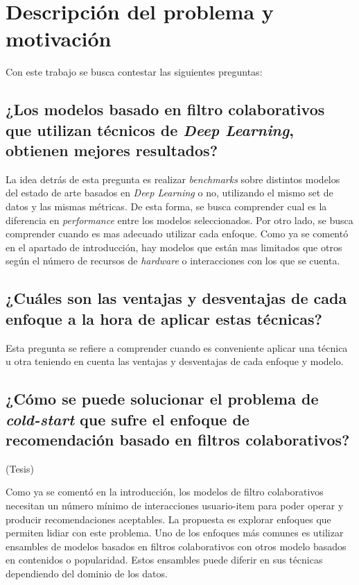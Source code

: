 \documentclass[11pt,a4paper,twoside]{thesis}
\begin{document}
\clearpage
\section{Descripción del problema y motivación}

Con este trabajo se busca contestar las siguientes preguntas:

\subsection{¿Los modelos basado en filtro colaborativos que utilizan técnicos de \textit{Deep Learning}, obtienen mejores resultados?}

La idea detrás de esta pregunta es realizar \textit{benchmarks} sobre distintos modelos del estado de arte basados en \textit{Deep Learning} o no, utilizando el mismo set de datos y las mismas métricas. De esta forma, se busca comprender cual es la diferencia en \textit{performance} entre los modelos seleccionados. Por otro lado, se busca comprender cuando es mas adecuado utilizar cada enfoque. Como ya se comentó en el apartado de introducción, hay modelos que están mas limitados que otros según el número de recursos de \textit{hardware} o interacciones con los que se cuenta.

\subsection{¿Cuáles son las ventajas y desventajas de cada enfoque a la hora de aplicar estas técnicas?}

Esta pregunta se refiere a comprender cuando es conveniente aplicar una técnica u otra teniendo en cuenta las ventajas y desventajas de cada enfoque y modelo.

\subsection{¿Cómo se puede solucionar el problema de \textit{cold-start} que sufre el enfoque de recomendación basado en filtros colaborativos?} (Tesis)

Como ya se comentó en la introducción, los modelos de filtro colaborativos necesitan un número mínimo de interacciones usuario-item para poder operar y producir recomendaciones aceptables. La propuesta es explorar enfoques que permiten lidiar con este problema. Uno de los enfoques más comunes es utilizar ensambles de modelos basados en filtros colaborativos con otros modelo basados en contenidos o popularidad. Estos ensambles puede diferir en sus técnicas dependiendo del dominio de los datos.
\end{document}
